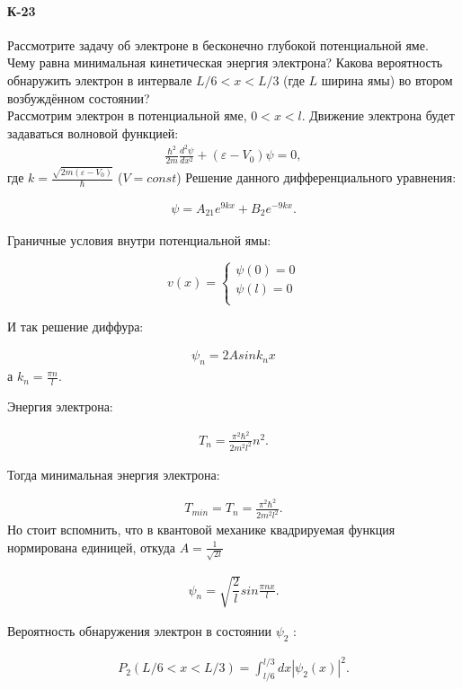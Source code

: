 \documentclass[__main__.tex]{subfiles}
\begin{document}
\paragraph{К-23}
Рассмотрите задачу об электроне в бесконечно глубокой потенциальной яме. Чему равна минимальная кинетическая энергия электрона? Какова вероятность обнаружить электрон в интервале $L/6<x<L/3$ (где $L$ ширина ямы) во втором возбуждённом состоянии?\\

Рассмотрим электрон в потенциальной яме, $0<x<l$.
Движение электрона будет задаваться волновой функцией:
\begin{gather}
 \frac{\hbar^{2}}{2m}\frac{d^{2}\psi}{dx^{2}}+(\varepsilon-V_{0})\psi=0,
\end{gather}
где $k=\frac{\sqrt{2m(\varepsilon-V_{0})}}{\hbar}$ ($V=const$)
Решение данного дифференциального уравнения:

\begin{gather}
\psi=A_{21}e^{9kx}+B_{2}e^{-9kx}.
\end{gather}

Граничные условия внутри потенциальной ямы:

$$
v(x)=
\left\{
\begin{gathered}
\psi(0)=0\\
\psi(l)=0\\
\end{gathered}
\right.
$$

И так решение диффура: 

\begin{gather}
\psi_{n}=2A sin{k_{n}x}
\end{gather}
а $k_{n}=\frac{\pi n}{l}.$

Энергия электрона:

\begin{gather}
T_{n}=\frac{\pi^{2}\hbar^{2}}{2m^{2}l^{2}}{}n^{2}.
\end{gather}

Тогда минимальная энергия электрона:

\begin{gather}
T_{min}=T_{n}=\frac{\pi^{2}\hbar^{2}}{2m^{2}l^{2}}.
\end{gather}
Но стоит вспомнить, что в квантовой механике квадрируемая функция нормирована единицей, откуда $A=\frac{1}{\sqrt{2l}}$

\begin{gather}
\psi_{n}=\sqrt{\dfrac{2}{l}} sin{\frac{\pi n x}{l}}.
\end{gather}

Вероятность обнаружения электрон в состоянии $\psi_{2}$ :

\begin{gather}
P_{2}(L/6<x<L/3)=\int_{l/6}^{l/3}dx|\psi_{2}(x)|^{2}.
\end{gather}
\end{document}
